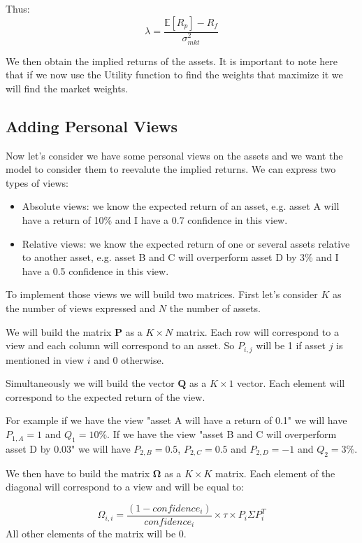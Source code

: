 \documentclass[11pt,a4paper]{article}
\begin{document}
Thus:
\begin{equation}
    \lambda = \frac{\mathbb{E}[R_p] - R_f}{\sigma_{mkt}^2}
\end{equation}

We then obtain the implied returns of the assets. It is important to note here that if we now use the Utility function to find the weights that maximize it we will find the market weights.

\subsection{Adding Personal Views}
Now let's consider we have some personal views on the assets and we want the model to consider them to reevalute the implied returns.
We can express two types of views:
\begin{itemize}
    \item Absolute views: we know the expected return of an asset, e.g. asset A will have a return of 10\% and I have a 0.7 confidence in this view.
    \item Relative views: we know the expected return of one or several assets relative to another asset, e.g. asset B and C will overperform asset D by 3\% and I have a 0.5 confidence in this view.
\end{itemize}

To implement those views we will build two matrices. First let's consider $K$ as the number of views expressed and $N$ the number of assets.

We will build the matrix $\mathbf{P}$ as a $K \times N$ matrix. Each row will correspond to a view and each column will correspond to an asset.
So $P_{i,j}$ will be 1 if asset $j$ is mentioned in view $i$ and 0 otherwise.

Simultaneously we will build the vector $\mathbf{Q}$ as a $K \times 1$ vector. Each element will correspond to the expected return of the view.

For example if we have the view "asset A will have a return of 0.1" we will have $P_{1,A} = 1$ and $Q_{1} = 10\%$.
If we have the view "asset B and C will overperform asset D by 0.03" we will have $P_{2,B} = 0.5$, $P_{2,C} = 0.5$ and $P_{2,D} = -1$ and $Q_{2} = 3\%$.

We then have to build the matrix $\mathbf{\Omega}$ as a $K \times K$ matrix. Each element of the diagonal will correspond to a view and will be equal to:

\begin{equation}
    \Omega_{i,i} = \frac{(1 - confidence_i)}{confidence_i} \times \tau \times P_{i} \Sigma P_{i}^T
\end{equation}
All other elements of the matrix will be 0.
\end{document}
